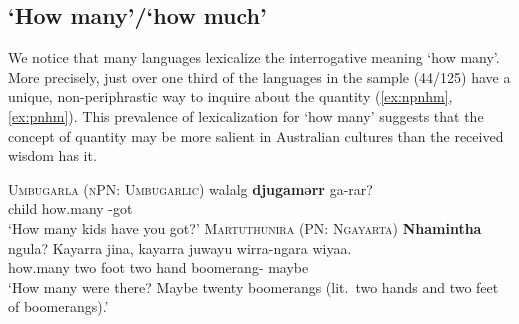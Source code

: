 \documentclass[12pt,egregdoesnotlikesansseriftitles]{scrartcl}
\makeatletter
\newcommand{\ofy}{/125} %
\makeatother
\begin{document}
\subsection{`How many'/`how much'}
\label{sec:howmany}
We notice that many languages lexicalize the interrogative meaning `how many'. More precisely, just over one third of the languages in the sample (44\ofy) have a unique, non-periphrastic way to inquire about the quantity (\ref{ex:npnhm}, \ref{ex:pnhm}). This prevalence of lexicalization for `how many' suggests that the concept of quantity may be more salient in Australian cultures than the received wisdom has it. 
\begin{exe}
  \ex\label{ex:npnhm}\textsc{Umbugarla (nPN: Umbugarlic)}\hfill {}
  \gll walalg \textbf{djugamərr} ga-rar?\\
  child how.many \Ssg-got\\
  \glt `How many kids have you got?'
  \ex\label{ex:pnhm}\textsc{Martuthunira (PN: Ngayarta)}\hfill {}
  \gll \textbf{Nhamintha} ngula? Kayarra jina, kayarra juwayu wirra-ngara wiyaa.\\
  how.many \Ignor{} two foot two hand boomerang-\Pl{} maybe\\
  \glt `How many were there? Maybe twenty boomerangs (lit.\ two hands and two feet of boomerangs).'
\end{exe}
\end{document}
